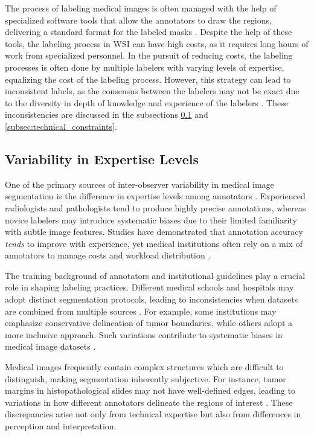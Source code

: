 The process of labeling medical images is often managed with the help of
specialized software tools that allow the annotators to draw the
regions, delivering a standard format for the labeled
masks \cite{Habis2024}.
Despite the help of these tools, the labeling process in \gls{WSI} can have high
costs, as it requires long hours of work from specialized personnel.
In the pursuit of reducing costs, the labeling processes
is often done by multiple labelers with varying levels of expertise, equalizing
the cost of the labeling process. However, this strategy can lead to
inconsistent labels, as the consensus between the labelers may not be
exact due to the diversity in depth of knowledge and experience of
the labelers \cite{XuYan2024}.
These inconsistencies are discussed in the subsections
\ref{subsec:expertise_levels} and \ref{subsec:technical_constraints}.

\subsection{Variability in Expertise Levels}\label{subsec:expertise_levels}

One of the primary sources of inter-observer variability in medical
image segmentation is the difference in expertise levels among
annotators \cite{Lopez2023}. Experienced radiologists and
pathologists tend to produce highly precise annotations, whereas
novice labelers may introduce systematic biases due to their limited
familiarity with subtle image features. Studies have demonstrated
that annotation accuracy \textit{tends} to improve with experience, yet medical
institutions often rely on a mix of annotators to manage costs and
workload distribution \cite{LuEtAl2023}.

The training background of annotators and institutional guidelines
play a crucial role in shaping labeling practices. Different medical
schools and hospitals may adopt distinct segmentation protocols,
leading to inconsistencies when datasets are combined from multiple
sources \cite{Lopez2023}. For example, some institutions may emphasize
conservative delineation of tumor boundaries, while others adopt a
more inclusive approach. Such variations contribute to systematic
biases in medical image datasets \cite{BanerjeeEtAl2025}.

Medical images frequently contain complex structures which are
difficult to distinguish, making segmentation inherently subjective.
For instance, tumor margins in histopathological slides may not have
well-defined edges, leading to variations in how different annotators delineate
the regions of interest \cite{Carmo2025}. These discrepancies arise not only
from technical expertise but also from differences in perception and
interpretation.

